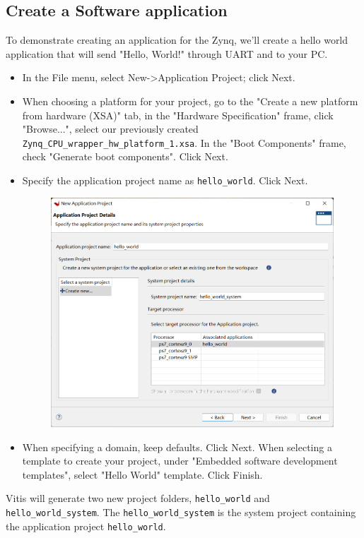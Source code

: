 \documentclass[a4paper,12pt,twoside]{article}
\begin{document}
\subsection{Create a Software application}
To demonstrate creating an application for the Zynq, we’ll create a hello world application that will send "Hello, World!" through UART and to your PC.
\begin{itemize}
    \item In the File menu, select New->Application Project; click Next.
    \item When choosing a platform for your project, go to the "Create a new platform from hardware (XSA)" tab, in the "Hardware Specification" frame, click "Browse...", select our previously created \texttt{Zynq\_CPU\_wrapper\_hw\_platform\_1.xsa}. In the "Boot Components" frame, check "Generate boot components". Click Next.
    \item Specify the application project name as \texttt{hello\_world}. Click Next.
    \begin{figure}[H]
        \centering
        \includegraphics[width=\textwidth]{images/14.png}
    \end{figure}
    \item When specifying a domain, keep defaults. Click Next. When selecting a template to create your project, under "Embedded software development templates", select "Hello World" template. Click Finish.
\end{itemize}
Vitis will generate two new project folders, \texttt{hello\_world} and \texttt{hello\_world\_system}. The \texttt{hello\_world\_system} is the system project containing the application project \texttt{hello\_world}.
\end{document}
